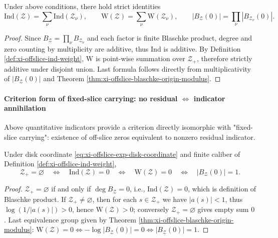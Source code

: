 \begin{theorem}\label{thm:xi-offslice-indicators-additivity}
Under above conditions, there hold strict identities
\[
\mathrm{Ind}(\mathcal Z)=\sum_{\nu}\mathrm{Ind}(\mathcal Z_{\nu}),
\qquad
\mathrm{W}(\mathcal Z)=\sum_{\nu}\mathrm{W}(\mathcal Z_{\nu}),
\qquad
|B_{\mathcal Z}(0)|=\prod_{\nu}|B_{\mathcal Z_{\nu}}(0)|.
\]
\end{theorem}

\begin{proof}
Since \(B_{\mathcal Z}=\prod_{\nu}B_{\mathcal Z_\nu}\) and each factor is finite Blaschke product, degree and zero counting by multiplicity are additive, thus \(\mathrm{Ind}\) is additive.
By Definition \ref{def:xi-offslice-ind-weight}, \(\mathrm{W}\) is point-wise summation over \(\mathcal Z_{+}\), therefore strictly additive under disjoint union.
Last formula follows directly from multiplicativity of \(|B_{\mathcal Z}(0)|\) and Theorem \ref{thm:xi-offslice-blaschke-origin-modulus}.
\end{proof}

\paragraph{Criterion form of fixed-slice carrying: no residual \texorpdfstring{$\Leftrightarrow$}{<->} indicator annihilation}
Above quantitative indicators provide a criterion directly isomorphic with "fixed-slice carrying": existence of off-slice zeros equivalent to nonzero residual indicator.

\begin{proposition}\label{prop:xi-offslice-fixed-slice-indicator-criterion}
Under disk coordinate \eqref{eq:xi-offslice-exp-disk-coordinate} and finite caliber of Definition \ref{def:xi-offslice-ind-weight},
\[
\mathcal Z_{+}=\varnothing
\quad\Longleftrightarrow\quad
\mathrm{Ind}(\mathcal Z)=0
\quad\Longleftrightarrow\quad
\mathrm{W}(\mathcal Z)=0
\quad\Longleftrightarrow\quad
|B_{\mathcal Z}(0)|=1.
\]
\end{proposition}

\begin{proof}
\(\mathcal Z_{+}=\varnothing\) if and only if \(\deg B_{\mathcal Z}=0\), i.e., \(\mathrm{Ind}(\mathcal Z)=0\), which is definition of Blaschke product.
If \(\mathcal Z_{+}\neq\varnothing\), then for each \(s\in\mathcal Z_{+}\) we have \(|a(s)|<1\), thus \(\log(1/|a(s)|)>0\), hence \(\mathrm{W}(\mathcal Z)>0\); conversely \(\mathcal Z_{+}=\varnothing\) gives empty sum \(0\).
Last equivalence group given by Theorem \ref{thm:xi-offslice-blaschke-origin-modulus}: \(\mathrm{W}(\mathcal Z)=0\iff -\log|B_{\mathcal Z}(0)|=0\iff |B_{\mathcal Z}(0)|=1\).
\end{proof}


